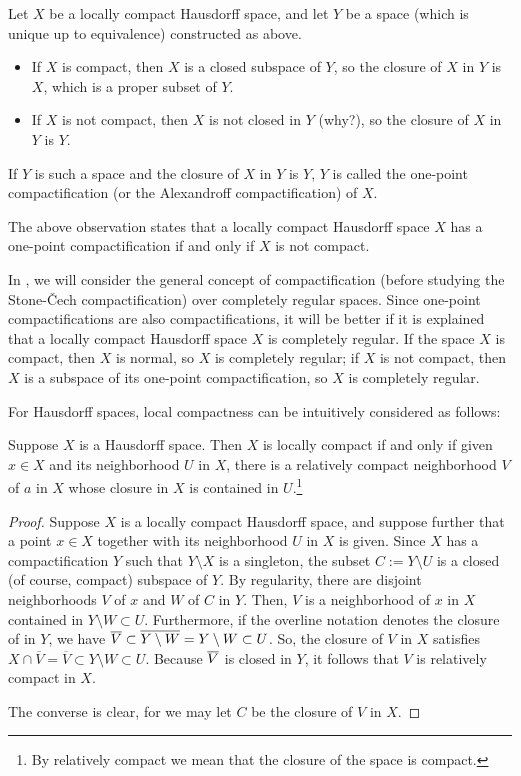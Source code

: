 Let $X$ be a locally compact Hausdorff space, and let $Y$ be a space (which is unique up to equivalence) constructed as above.
\begin{itemize}
    \item
    {
        If $X$ is compact, then $X$ is a closed subspace of $Y$, so the closure of $X$ in $Y$ is $X$, which is a proper subset of $Y$.
    }
    \item
    {
        If $X$ is not compact, then $X$ is not closed in $Y$ \color{brown}(why?)\color{black}, so the closure of $X$ in $Y$ is $Y$.
    }
\end{itemize}
If $Y$ is such a space and the closure of $X$ in $Y$ is $Y$, $Y$ is called the one-point compactification (or the Alexandroff compactification) of $X$.
\begin{rmk}
    The above observation states that a locally compact Hausdorff space $X$ has a one-point compactification if and only if $X$ is not compact.
\end{rmk}
\begin{rmk}
    In , we will consider the general concept of compactification (before studying the Stone-\v{C}ech compactification) over completely regular spaces.
    Since one-point compactifications are also compactifications, it will be better if it is explained that a locally compact Hausdorff space $X$ is completely regular.
    If the space $X$ is compact, then $X$ is normal, so $X$ is completely regular; if $X$ is not compact, then $X$ is a subspace of its one-point compactification, so $X$ is completely regular.
\end{rmk}

For Hausdorff spaces, local compactness can be intuitively considered as follows:
\begin{prop}
    Suppose $X$ is a Hausdorff space.
    Then $X$ is locally compact if and only if given $x\in X$ and its neighborhood $U$ in $X$, there is a relatively compact neighborhood $V$ of $a$ in $X$ whose closure in $X$ is contained in $U$.\footnote{By relatively compact we mean that the closure of the space is compact.}
\end{prop}
\begin{proof}
    Suppose $X$ is a locally compact Hausdorff space, and suppose further that a point $x\in X$ together with its neighborhood $U$ in $X$ is given.
    Since $X$ has a compactification $Y$ such that $Y\setminus X$ is a singleton, the subset $C:=Y\setminus U$ is a closed (of course, compact) subspace of $Y$.
    By regularity, there are disjoint neighborhoods $V$ of $x$ and $W$ of $C$ in $Y$.
    Then, $V$ is a neighborhood of $x$ in $X$ contained in $Y\setminus W\subset U$.
    Furthermore, if the overline notation denotes the closure of in $Y$, we have $\overline{V}\subset \overline{Y\setminus W}=Y\setminus W\subset U$.
    So, the closure of $V$ in $X$ satisfies $X\cap\overline{V}=\overline{V}\subset Y\setminus W\subset U$.
    Because $\overline{V}$ is closed in $Y$, it follows that $V$ is relatively compact in $X$.

    The converse is clear, for we may let $C$ be the closure of $V$ in $X$.
\end{proof}

